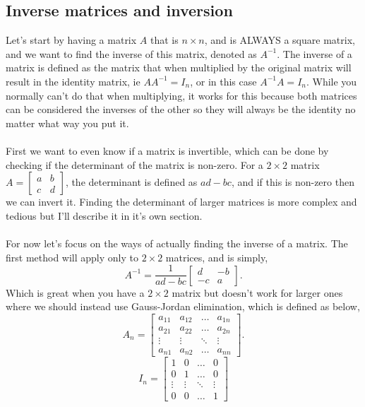 \documentclass{report}
\begin{document}
\begin{multicols}{2}
\section{Inverse matrices and inversion}%
\label{sec: Inverse matrices and inversion }
Let's start by having a matrix $ A $ that is $ n \times n $, and is ALWAYS a square matrix, and we want to find the inverse of this matrix, denoted as $ A^{-1} $. The inverse of a matrix is defined as the matrix that when multiplied by the original matrix will result in the identity matrix, ie $ AA^{-1} = I_n $, or in this case $ A^{ -1 }A = I_n $. While you normally can't do that when multiplying, it works for this because both matrices can be considered the inverses of the other so they will always be the identity no matter what way you put it.  \\\\
First we want to even know if a matrix is invertible, which can be done by checking if the determinant of the matrix is non-zero. For a $ 2\times 2 $ matrix $ A = \begin{bmatrix} a & b \\ c & d \end{bmatrix} $, the determinant is defined as $ ad - bc $, and if this is non-zero then we can invert it. Finding the determinant of larger matrices is more complex and tedious but I'll describe it in it's own section. \\\\
For now let's focus on the ways of actually finding the inverse of a matrix. The first method will apply only to $ 2\times 2 $ matrices, and is simply,
\[
A^{ -1 } = \frac{1}{ad - bc} \begin{bmatrix} d & -b \\ -c & a \end{bmatrix}
.\] 
Which is great when you have a $ 2 \times 2 $ matrix but doesn't work for larger ones where we should instead use Gauss-Jordan elimination, which is defined as below,
\[
A_n = \begin{bmatrix} a_{ 11 } & a_{ 12 } & \ldots & a_{ 1n } \\ a_{ 21 } & a_{ 22 } & \ldots & a_{ 2n } \\ \vdots & \vdots & \ddots & \vdots \\ a_{ n1 } & a_{ n2 } & \ldots & a_{ nn }\end{bmatrix}
.\] 
\[
I_n = \begin{bmatrix} 1 & 0 & \ldots & 0 \\ 0 & 1 & \ldots & 0 \\ \vdots & \vdots & \ddots & \vdots \\ 0 & 0 & \ldots & 1 \end{bmatrix}
\]
\end{multicols}
\end{document}
